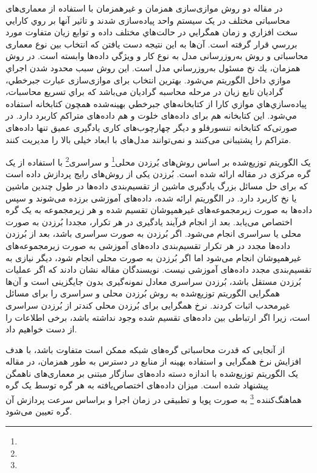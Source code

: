  در مقاله \cite{Ma2019} دو روش موازی‌سازی  همزمان و  غیرهمزمان با استفاده از معماری‌های‌ محاسباتی مختلف در یک سیستم واحد پیاده‌سازی شدند و تاثير آنها بر روي كارايي سخت افزاري و زمان همگرايي در حالت‌هاي مختلف داده و توابع زیان متفاوت مورد بررسي قرار گرفته است. آن‌ها به این نتیجه دست یافتن که انتخاب بين نوع معماری محاسباتی و روش به‌روزرسانی مدل  به نوع کار و ويژگي داده‌ها وابسته است. در روش  همزمان، يك نخ مسئول به‌روزرساني مدل است. اين روش سبب محدود شدن اجراي موازي داخل الگوریتم مي‌شود. بهترین انتخاب برای موازی‌سازی عبارت جبرخطي، گراديان تابع زیان در مرحله محاسبه گراديان می‌باشد که براي تسريع محاسبات، پياده‌سازي‌هاي موازي كارا از كتابخانه‌هاي جبرخطي بهينه‌شده همچون کتابخانه  استفاده مي‌شود. این کتابخانه هم برای داده‌های خلوت و هم داده‌های متراکم کاربرد دارد. در صورتی‌که کتابخانه تنسورفلو و دیگر چهارچوب‌های کاری یادگیری عمیق تنها داده‌های متراکم را پشتیبانی می‌کنند و نمی‌توانند مدل‌های با ابعاد خیلی بالا را مدیریت کنند. 
 
 یک الگوریتم  توزیع‌شده بر اساس روش‌های بُرزدن محلی\footnote{}  و سراسری\footnote{}  با استفاده از یک گره مرکزی در مقاله \cite{MENG201946} ارائه شده است. بُرزدن یکی از روش‌های رایج پردازش داده است که برای حل مسائل بزرگ یادگیری ماشین از تقسیم‌بندی داده‌ها در طول چندین ماشین یا نخ کاربرد دارد. در الگوریتم ارائه شده، داده‌های آموزشی برزده می‌شوند و سپس داده‌ها به صورت زیرمجموعه‌های غیرهمپوشان تقسیم شده و هر زیرمجموعه به یک گره اختصاص می‌یابد. بعد از انجام فرآیند یادگیری در هر تکرار، مجددا بُرزدن به صورت محلی یا سراسری انجام می‌شود. اگر بُرزدن به صورت سراسری باشد، بعد از بُرزدن داده‌ها مجدد در هر تکرار تقسیم‌بندی داده‌های آموزشی به صورت زیرمجموعه‌های غیرهمپوشان انجام می‌شود اما اگر بُرزدن به صورت محلی انجام شود، دیگر نیازی به تقسیم‌بندی مجدد داده‌های آموزشی نیست. نویسندگان مقاله نشان دادند که اگر عملیات بُرزدن مستقل باشد، بُرزدن سراسری معادل نمونه‌گیری بدون جایگزینی است و آن‌ها همگرایی الگوریتم  توزیع‌شده به روش بُرزدن محلی و سراسری را برای مسائل غیرمحدب اثبات کردند. نرخ همگرایی برای بُرزدن محلی کندتر از بُرزدن سراسری است، زیرا اگر ارتباطی بین داده‌های تقسیم شده وجود نداشته باشد، برخی اطلاعات را از دست خواهیم داد.
 
 از آنجایی که قدرت محاسباتی گره‌های شبکه ممکن است متفاوت باشد، با هدف افزایش نرخ همگرایی و استفاده بهینه از منابع در دسترس به طور همزمان، در مقاله \cite{Ma2021} یک الگوریتم‌  توزیع‌شده با اندازه‌‌ دسته داده‌های سازگار  مبتنی بر معماری‌های ناهمگن   پیشنهاد شده است. میزان داده‌های اختصاص‌یافته به هر گره توسط یک گره هماهنگ‌کننده \footnote{} به صورت پویا و تطبیقی در زمان اجرا و براساس سرعت پردازش آن گره تعیین می‌شود. 
 
